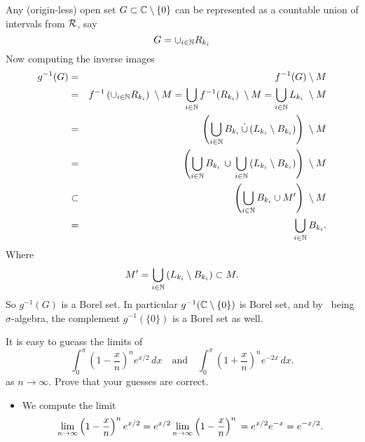 \begin{enumerate}
Any (origin-less) open set \(G\subset \mathbb{C}\setminus\{0\}\)
can be represented as a countable union of intervals from \(\cal{R}\),
say
\begin{equation*}
G = \cup_{i\in\mathbb{N}} R_{k_i}
\end{equation*}
Now computing the inverse images
\begin{eqnarray*}
 g^{-1}(G)
 &=&  f^{-1}(G) \setminus M \\
 &=& f^{-1}\left(\cup_{i\in\N} R_{k_i}\right) \;\setminus M
     = \bigcup_{i\in\N} f^{-1}( R_{k_i}) \;\setminus M
     = \bigcup_{i\in\N} L_{k_i} \;\setminus M \\
 &=& \left(\bigcup_{i\in\N} B_{k_i}
     \disjunion \left(L_{k_i}\setminus B_{k_i}\right)\right) \;\setminus M \\
 &=& \left(\bigcup_{i\in\N} B_{k_i}
     \,\cup\, \bigcup_{i\in\N}  \left(L_{k_i}\setminus B_{k_i}\right)
     \right) \;\setminus M \\
 &\subset&  \left(\bigcup_{i\in\N} B_{k_i} \cup M'\right) \;\setminus M \\
 &=& \bigcup_{i\in\N} B_{k_i}.
\end{eqnarray*}
Where
\begin{equation*}
 M' = \bigcup_{i\in\mathbb{N}}  \left(L_{k_i}\setminus B_{k_i}\right) \subset M.
\end{equation*}
So \(g^{-1}(G)\) is a Borel set. In particular \(g^{-1}(\mathbb{C}\setminus\{0\})\)
is Borel set, and by \calB\ being \(\sigma\)-algebra,
the complement \(g^{-1}(\{0\})\) is a Borel set as well.


\begin{excopy}
It is easy to gueass the limits of
\begin{equation*}
 \int_0^\pi \left(1 - \frac{x}{n}\right)^n e^{x/2}\, dx
 \quad\textrm{and}\quad
 \int_0^\pi \left(1 + \frac{x}{n}\right)^n e^{-2x}\, dx.
\end{equation*}
as \(n\to\infty\). Prove that your guesses are correct.
\end{excopy}

\begin{itemize}

\item
We compute the limit
\begin{equation*}
\lim_{n\to\infty} \left(1 - \frac{x}{n}\right)^n e^{x/2}
=  e^{x/2} \lim_{n\to\infty} \left(1 - \frac{x}{n}\right)^n \\
=  e^{x/2} e^{-x} = e^{-x/2}.
\end{equation*}


\end{itemize}
\end{enumerate}
